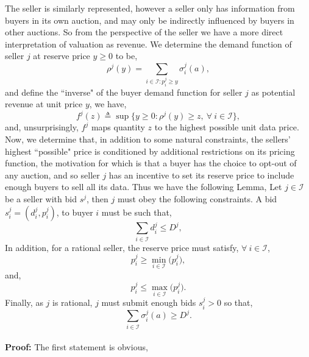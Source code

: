 \documentclass[12pt]{article}
\theoremstyle{definition}
\newcommand{\mcI}{\mathcal{I}}
\newcommand{\g}{\sigma}
\begin{document}
\begin{multicols}{2}
The seller is similarly represented, however a seller only has
information from buyers in its own auction, and may only be indirectly influenced by
buyers in other auctions. So from the perspective of the
seller we have a more direct interpretation of valuation as revenue.
We determine the demand function of seller $j$ at reserve price $y\ge 0$ to be,
\begin{equation}\label{datademand}
    \rho^j(y) = \sum_{i\in\mcI : p_i^j\ge y} \g_i^j(a), 
\end{equation}
and define the ``inverse" of the buyer demand function for seller $j$ as
potential revenue at unit price $y$, we have, 
\begin{equation}\label{sellerinversedemand}
    f^j(z) \triangleq \sup\big\lbrace y\ge 0:
        \rho^j(y) \ge z, \ \forall \ i \in \mcI\big\rbrace,
\end{equation}
and, unsurprisingly, $f^j$ maps quantity $z$ to the highest possible unit data
price. Now, we determine that, in addition to some natural constraints, the sellers' highest
``possible" price is conditioned by
additional restrictions on its pricing function, the motivation for which is
that a buyer has the choice to opt-out of any auction, and so seller $j$ has an
incentive to set its reserve price to include enough buyers to sell all its
data. Thus we have the following Lemma,
{
\label{sellerconstraints}
Let $j\in\mcI$ be a seller with bid $s^j$, then $j$ must obey the following constraints.
A bid $s_i^j= (d_i^j, p_i^j)$, to buyer $i$ must be such that,
\begin{equation}\label{datacapmax}
    \sum_{i\in\mcI} d^j_i \le D^j,
\end{equation}
In addition, for a rational seller, the reserve price must
satisfy, $\forall \ i\in \mcI$,
\begin{equation}\label{reservepricemin}
   p_i^j \ge \min_{i\in\mcI}\big(p_i^j),
\end{equation}
and,
\begin{equation}\label{reservepricemax}
   p_i^j \le \max_{i\in\mcI}\big(p_i^j).
\end{equation}
Finally, as $j$ is rational, $j$ must submit enough bids $s_i^j >0$ so that,
\begin{equation}\label{datacapmin}
    \displaystyle\sum_{i\in\mcI} \g_i^j(a) \ge D^j.
\end{equation}
}\\
\textbf{Proof:}
The first statement is obvious, 

\end{multicols}
\end{document}
